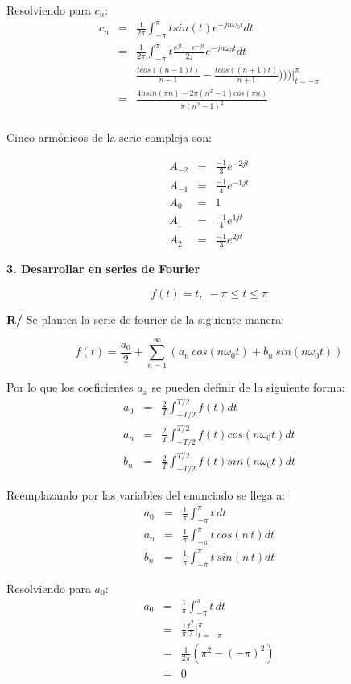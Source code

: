 \documentclass[a4paper]{article}
\begin{document}
Resolviendo para $c_n$:
\begin{eqnarray*}
c
_n &=& \frac{1}{2\pi}\int_{-\pi}^{\pi}tsin(t)e^{-jn\omega_0t}dt\\
&=& \frac{1}{2\pi}\int_{-\pi}^{\pi}t \frac{e^{jt} -e^{-jt}}{2j} e^{-jn\omega_0t}dt\\
& & \frac{tcos((n-1)t)}{n-1} - \frac{tcos((n+1)t)}{n+1})\bigg)\bigg)\bigg|_{t=-\pi}^{\pi}\\
&=& \frac{4nsin(\pi n)-2\pi(n^{2}-1)cos(\pi n)}{\pi(n^{2}- 1)^{2}}\\
\end{eqnarray*}

Cinco armónicos de la serie compleja son:

\begin{eqnarray*}
A_{-2} &=& \frac{-1}{3} e^{-2 j t} \\
A_{-1} &=& \frac{-1}{4} e^{-1 j t} \\
A_0 &=& 1 \\
A_1 &=& \frac{-1}{4} e^{1 j t}\\
A_2 &=& \frac{-1}{3} e^{2 j t}
\end{eqnarray*}


\textbf{3. Desarrollar en series de Fourier}

$$f(t) = t,\; -\pi \leq t \leq \pi$$

\textbf{R/} Se plantea la serie de fourier de la siguiente manera:

$$f(t) = \frac{a_0}{2} + \sum_{n=1}^\infty\left(a_n\,cos(n\omega_0t) + b_n\,sin(n\omega_0t)\right)$$

Por lo que los coeficientes $a_x$ se pueden definir de la siguiente forma:
\begin{eqnarray*}
a_0 &=& \frac{2}{T}\int_{-T/2}^{T/2}f(t)dt\\
a_n &=& \frac{2}{T}\int_{-T/2}^{T/2}f(t)cos(n\omega_0t)dt\\
b_n &=& \frac{2}{T}\int_{-T/2}^{T/2}f(t)sin(n\omega_0t)dt
\end{eqnarray*}

Reemplazando por las variables del enunciado se llega a:
\begin{eqnarray*}
a_0 &=& \frac{1}{\pi}\int_{-\pi}^{\pi}t\,dt\\
a_n &=& \frac{1}{\pi}\int_{-\pi}^{\pi}t\,cos(n\,t)dt\\
b_n &=& \frac{1}{\pi}\int_{-\pi}^{\pi}t\,sin(n\,t)dt
\end{eqnarray*}

Resolviendo para $a_0$:
\begin{eqnarray*}
a_0 &=& \frac{1}{\pi}\int_{-\pi}^{\pi}t\,dt\\
&=& \frac{1}{\pi} \frac{t^2}{2}\bigg|_{t=-\pi}^{\pi}\\
&=& \frac{1}{2\pi} (\pi^2 - (-\pi)^2)\\
&=& 0
\end{eqnarray*}
\end{document}
